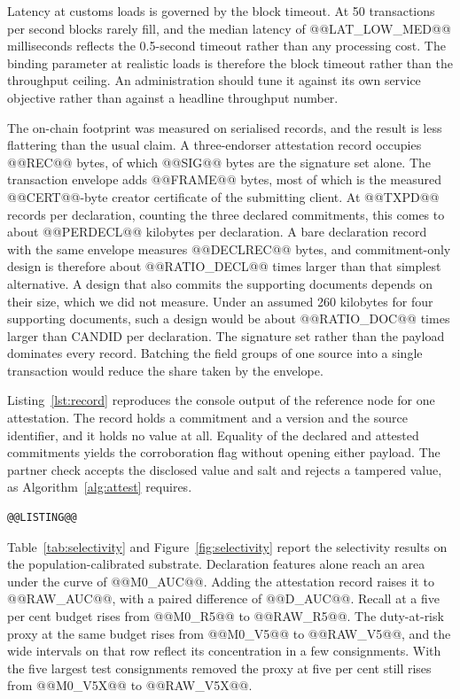 \documentclass[information,article,submit,moreauthors]{Definitions/mdpi}
\begin{document}


Latency at customs loads is governed by the block timeout. At 50 transactions per second blocks rarely fill, and the median latency of @@LAT_LOW_MED@@ milliseconds reflects the 0.5-second timeout rather than any processing cost. The binding parameter at realistic loads is therefore the block timeout rather than the throughput ceiling. An administration should tune it against its own service objective rather than against a headline throughput number.

The on-chain footprint was measured on serialised records, and the result is less flattering than the usual claim. A three-endorser attestation record occupies @@REC@@ bytes, of which @@SIG@@ bytes are the signature set alone. The transaction envelope adds @@FRAME@@ bytes, most of which is the measured @@CERT@@-byte creator certificate of the submitting client. At @@TXPD@@ records per declaration, counting the three declared commitments, this comes to about @@PERDECL@@ kilobytes per declaration. A bare declaration record with the same envelope measures @@DECLREC@@ bytes, and commitment-only design is therefore about @@RATIO_DECL@@ times larger than that simplest alternative. A design that also commits the supporting documents depends on their size, which we did not measure. Under an assumed 260 kilobytes for four supporting documents, such a design would be about @@RATIO_DOC@@ times larger than CANDID per declaration. The signature set rather than the payload dominates every record. Batching the field groups of one source into a single transaction would reduce the share taken by the envelope.

Listing~\ref{lst:record} reproduces the console output of the reference node for one attestation. The record holds a commitment and a version and the source identifier, and it holds no value at all. Equality of the declared and attested commitments yields the corroboration flag without opening either payload. The partner check accepts the disclosed value and salt and rejects a tampered value, as Algorithm~\ref{alg:attest} requires.

\begin{lstlisting}[caption={Console output of the reference node for one attestation.},label={lst:record}]
@@LISTING@@
\end{lstlisting}

Table~\ref{tab:selectivity} and Figure~\ref{fig:selectivity} report the selectivity results on the population-calibrated substrate. Declaration features alone reach an area under the curve of @@M0_AUC@@. Adding the attestation record raises it to @@RAW_AUC@@, with a paired difference of @@D_AUC@@. Recall at a five per cent budget rises from @@M0_R5@@ to @@RAW_R5@@. The duty-at-risk proxy at the same budget rises from @@M0_V5@@ to @@RAW_V5@@, and the wide intervals on that row reflect its concentration in a few consignments. With the five largest test consignments removed the proxy at five per cent still rises from @@M0_V5X@@ to @@RAW_V5X@@.
\end{document}
